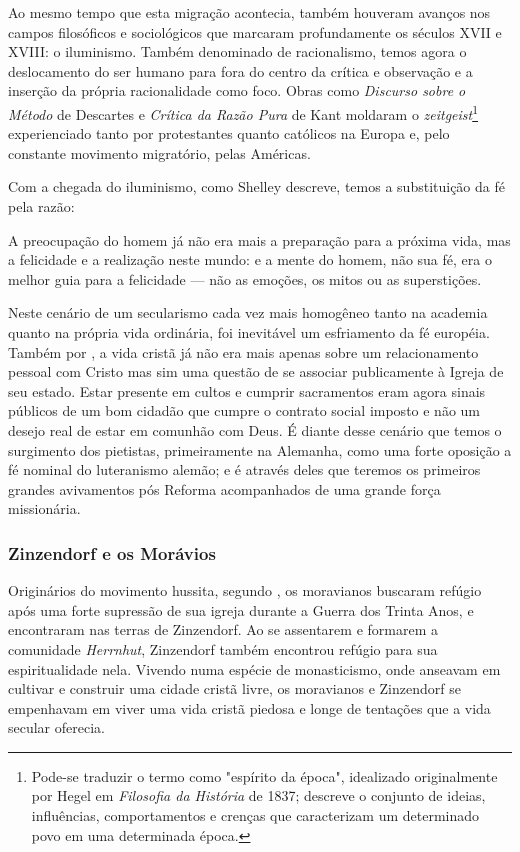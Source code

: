 \documentclass[
    article,            %
	12pt,				%
	oneside,			%
	a4paper,			%
	chapter=TITLE,		%
	section=TITLE,		%
	english,			%
	french,				%
	spanish,			%
	brazil				%
	]{abntex2}
\begin{document}
Ao mesmo tempo que esta migração acontecia, também houveram avanços nos campos filosóficos e sociológicos que marcaram profundamente os séculos XVII e XVIII: o iluminismo. Também denominado de racionalismo, temos agora o deslocamento do ser humano para fora do centro da crítica e observação e a inserção da própria racionalidade como foco. Obras como \emph{Discurso sobre o Método} de Descartes e \emph{Crítica da Razão Pura} de Kant moldaram o \emph{zeitgeist}\footnote{Pode-se traduzir o termo como "espírito da época", idealizado originalmente por Hegel em \emph{Filosofia da História} de 1837; descreve o conjunto de ideias, influências, comportamentos e crenças que caracterizam um determinado povo em uma determinada época.} experienciado tanto por protestantes quanto católicos na Europa e, pelo constante movimento migratório, pelas Américas.

Com a chegada do iluminismo, como Shelley descreve, temos a substituição da fé pela razão:
\begin{citacao}
A preocupação do homem já não era mais a preparação para a próxima vida, mas a felicidade e a realização neste mundo: e a mente do homem, não sua fé, era o melhor guia para a felicidade — não as emoções, os mitos ou as superstições. \cite[p.205]{SHELLEY}
\end{citacao}

Neste cenário de um secularismo cada vez mais homogêneo tanto na academia quanto na própria vida ordinária, foi inevitável um esfriamento da fé européia. Também por , a vida cristã já não era mais apenas sobre um relacionamento pessoal com Cristo mas sim uma questão de se associar publicamente à Igreja de seu estado. Estar presente em cultos e cumprir sacramentos eram agora sinais públicos de um bom cidadão que cumpre o contrato social imposto e não um desejo real de estar em comunhão com Deus. É diante desse cenário que temos o surgimento dos pietistas, primeiramente na Alemanha, como uma forte oposição a fé nominal do luteranismo alemão; e é através deles que teremos os primeiros grandes avivamentos pós Reforma acompanhados de uma grande força missionária.

\subsubsection{Zinzendorf e os Morávios}
Originários do movimento hussita, segundo , os moravianos buscaram refúgio após uma forte supressão de sua igreja durante a Guerra dos Trinta Anos, e encontraram nas terras de Zinzendorf. Ao se assentarem e formarem a comunidade \emph{Herrnhut}, Zinzendorf também encontrou refúgio para sua espiritualidade nela. Vivendo numa espécie de monasticismo, onde anseavam em cultivar e construir uma cidade cristã livre, os moravianos e Zinzendorf se empenhavam em viver uma vida cristã piedosa e longe de tentações que a vida secular oferecia.
\end{document}
